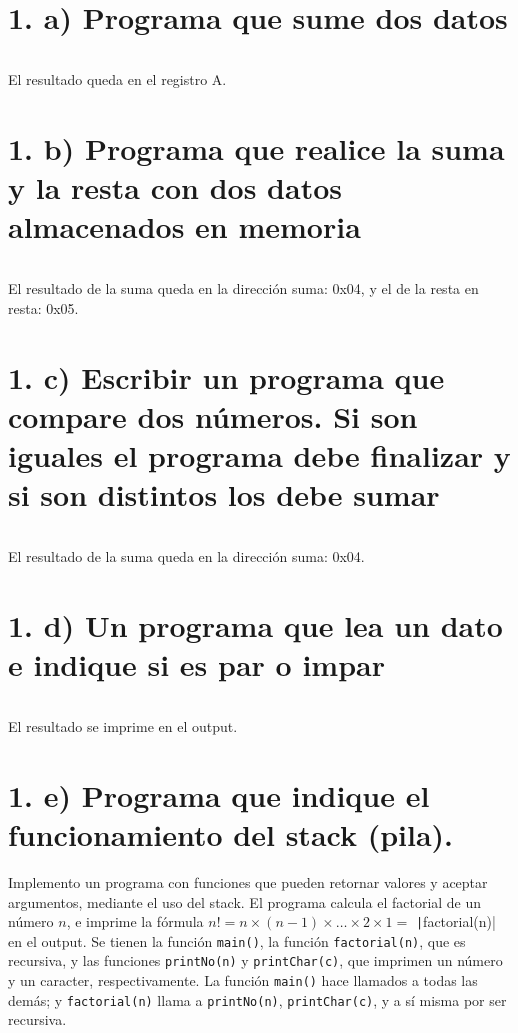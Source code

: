 \documentclass{article}
\begin{document}


\section*{1. a) Programa que sume dos datos}

\inputminted{nasm}{./code/1a.txt}

El resultado queda en el registro A.

\section*{1. b) Programa que realice la suma y la resta con dos datos almacenados en memoria}

\inputminted{nasm}{./code/1b.txt}

El resultado de la suma queda en la dirección suma: 0x04, y el de la resta en resta: 0x05.

\section*{1. c) Escribir un programa que compare dos números. Si son iguales el programa debe finalizar y si son distintos los debe sumar}

\inputminted{nasm}{./code/1c.txt}

El resultado de la suma queda en la dirección suma: 0x04.

\section*{1. d) Un programa que lea un dato e indique si es par o impar}

\inputminted{nasm}{./code/1d.txt}

El resultado se imprime en el output.

\section*{1. e) Programa que indique el funcionamiento del stack (pila).}

Implemento un programa con funciones que pueden retornar valores y aceptar argumentos, mediante el uso del stack. El programa calcula el factorial de un número $n$, e imprime la fórmula $n! = n \times (n-1) \times \dots \times 2 \times 1 =$ \texttt|factorial(n)| en el output. Se tienen la función \texttt{main()}, la función \texttt{factorial(n)}, que es recursiva, y las funciones \texttt{printNo(n)} y \texttt{printChar(c)}, que imprimen un número y un caracter, respectivamente. La función \texttt{main()} hace llamados a todas las demás; y \texttt{factorial(n)} llama a \texttt{printNo(n)}, \texttt{printChar(c)}, y a sí misma por ser recursiva. 
\end{document}

